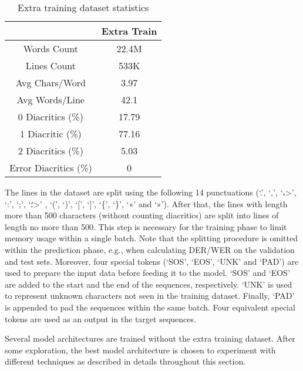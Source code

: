 \documentclass[11pt,a4paper]{article}
\newcommand{\para}[1]{\medskip \noindent {\bf #1}}
\begin{document}
\begin{table}
\centering
\caption{Extra training dataset statistics}
\label{tab:extra_dataset}
\begin{tabular}{c|c|}
\cline{2-2}
                                            & Extra Train \\ \hline
\multicolumn{1}{|c|}{Words Count}           & 22.4M       \\ \hline
\multicolumn{1}{|c|}{Lines Count}           & 533K        \\ \hline
\multicolumn{1}{|c|}{Avg Chars/Word}        & 3.97        \\ \hline
\multicolumn{1}{|c|}{Avg Words/Line}        & 42.1        \\ \hline
\multicolumn{1}{|c|}{0 Diacritics (\%)}     & 17.79       \\ \hline
\multicolumn{1}{|c|}{1 Diacritic (\%)}      & 77.16       \\ \hline
\multicolumn{1}{|c|}{2 Diacritics (\%)}     & 5.03        \\ \hline
\multicolumn{1}{|c|}{Error Diacritics (\%)} & 0           \\ \hline
\end{tabular}
\end{table}

The lines in the dataset are split using the following 14 punctuations (`.', `,', 
`\<،>',
`:', `;', 
`\<؛>'
, `(', `)', `[', `]', `\{', `\}', `«' and `»'). After that, the lines with length more than 500 characters (without counting diacritics) are split into lines of length no more than 500. This step is necessary for the training phase to limit memory usage within a single batch. Note that the splitting procedure is omitted within the prediction phase, e.g., when calculating DER/WER on the validation and test sets. Moreover, four special tokens (`SOS', `EOS', `UNK' and `PAD') are used to prepare the input data before feeding it to the model. `SOS' and `EOS' are added to the start and the end of the sequences, respectively. `UNK' is used to represent unknown characters not seen in the training dataset. Finally, `PAD' is appended to pad the sequences within the same batch. Four equivalent special tokens are used as an output in the target sequences.

\para{Basic Model.}
Several model architectures are trained without the extra training dataset. After some exploration, the best model architecture is chosen to experiment with different techniques as described in details throughout this section.
\end{document}
